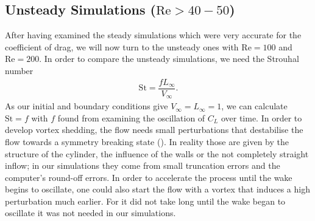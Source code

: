 	\subsection{Unsteady Simulations ($\text{Re}> 40-50$)}
	After having examined the steady simulations which were very accurate for the coefficient of drag, we will now turn to the unsteady ones with $\text{Re}=100$ and $\text{Re}=200$.
	In order to compare the unsteady simulations, we need the Strouhal number
	\begin{align}
		\text{St} = \dfrac{f  L_\infty}{V_\infty}.
	\end{align}
	As our initial and boundary conditions give $V_\infty = L_\infty = 1$, we can calculate $\text{St} = f$ with $f$ found from examining the oscillation of $C_L$ over time. In order to develop vortex shedding, the flow needs small perturbations that destabilise the flow towards a symmetry breaking state (\textcite{FLM:14223}). In reality those are given by the structure of the cylinder, the influence of the walls or the not completely straight inflow; in our simulations they come from small truncation errors and the computer's round-off errors. 
	In order to accelerate the process until the wake begins to oscillate, one could also start the flow with a vortex that induces a high perturbation much earlier. For it did not take long until the wake began to oscillate it was not needed in our simulations.
